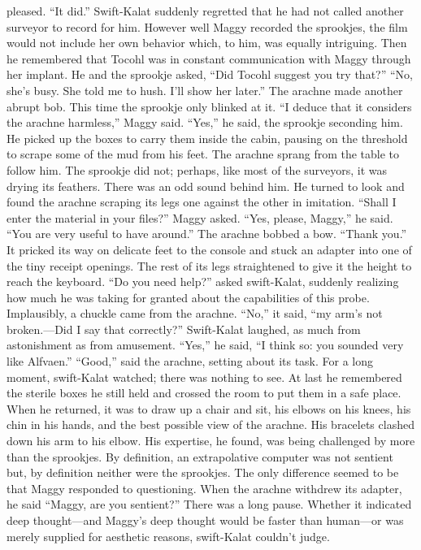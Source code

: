 \documentclass[9pt]{article}
\begin{document}
pleased. “It did.”
Swift-Kalat suddenly regretted that he had not called another surveyor to record for him. However
well Maggy recorded the sprookjes, the film would not include her own behavior which, to him, was
equally intriguing. Then he remembered that Tocohl was in constant communication with Maggy through
her implant. He and the sprookje asked, “Did Tocohl suggest you try that?”
“No, she’s busy. She told me to hush. I’ll show her later.” The arachne made another abrupt bob.
This time the sprookje only blinked at it. “I deduce that it considers the arachne harmless,” Maggy said.
“Yes,” he said, the sprookje seconding him. He picked up the boxes to carry them inside the cabin,
pausing on the threshold to scrape some of the mud from his feet. The arachne sprang from the table to
follow him. The sprookje did not; perhaps, like most of the surveyors, it was drying its feathers.
There was an odd sound behind him. He turned to look and found the arachne scraping its legs one
against the other in imitation.
“Shall I enter the material in your files?” Maggy asked.
“Yes, please, Maggy,” he said. “You are very useful to have around.”
The arachne bobbed a bow. “Thank you.” It pricked its way on delicate feet to the console and
stuck an adapter into one of the tiny receipt openings. The rest of its legs straightened to give it the height
to reach the keyboard.
“Do you need help?” asked swift-Kalat, suddenly realizing how much he was taking for granted
about the capabilities of this probe.
Implausibly, a chuckle came from the arachne. “No,” it said, “my arm’s not broken.—Did I say that
correctly?”
Swift-Kalat laughed, as much from astonishment as from amusement. “Yes,” he said, “I think so: you
sounded very like Alfvaen.”
“Good,” said the arachne, setting about its task.
For a long moment, swift-Kalat watched; there was nothing to see. At last he remembered the sterile
boxes he still held and crossed the room to put them in a safe place. When he returned, it was to draw up
a chair and sit, his elbows on his knees, his chin in his hands, and the best possible view of the arachne.
His bracelets clashed down his arm to his elbow.
His expertise, he found, was being challenged by more than the sprookjes. By definition, an
extrapolative computer was not sentient but, by definition neither were the sprookjes. The only difference
seemed to be that Maggy responded to questioning.
When the arachne withdrew its adapter, he said “Maggy, are you sentient?”
There was a long pause. Whether it indicated deep thought—and Maggy’s deep thought would be
faster than human—or was merely supplied for aesthetic reasons, swift-Kalat couldn’t judge.
\end{document}

